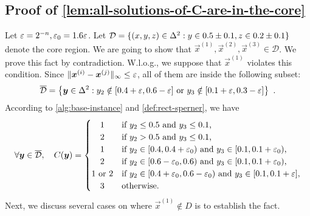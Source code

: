 \subsection{Proof of \cref{lem:all-solutions-of-C-are-in-the-core}}
\label{proof:all-solutions-of-C-are-in-the-core}

\repi*

    Let $\varepsilon=2^{-n}, \varepsilon_0=1.6\varepsilon$.
    Let $\mathcal{D}=\{{(x,y,z)\in \Delta^2: y\in 0.5\pm 0.1, z\in 0.2\pm 0.1} \}$ denote the core region.
    We are going to show that $\vec{x}^{(1)}, \vec{x}^{(2)}, \vec{x}^{(3)}\in \mathcal{D}$.
    We prove this fact by contradiction. 
    W.l.o.g., we suppose that $\vec{x}^{(1)}$ violates this condition.
    Since $\| {\boldsymbol{x}^{(i)}-\boldsymbol{x}^{(j)}} \|_{\infty}\leq \varepsilon$, all of them are inside the following subset:
    \begin{align*}
        \overline{\mathcal{D}} = \left \{{\boldsymbol{y}\in \Delta^2: y_2\notin [0.4+\varepsilon,0.6-\varepsilon] \text{ or } y_3\notin [0.1+\varepsilon,0.3-\varepsilon]} \right \} ~.
    \end{align*}
    According to \cref{alg:base-instance} and \cref{def:rect-sperner}, we have 
    \begin{align*}
        \forall \vec{y}\in \overline{\mathcal{D}}, \quad C(\vec{y}) = \begin{cases}
            \hfill 1 \hfill & \text{if $y_2\leq 0.5$ and $y_3\leq 0.1$,} 
            \\
            \hfill 2 \hfill & \text{if $y_2> 0.5$ and $y_3\leq 0.1$,}\\
            \hfill 1 \hfill & \text{if $y_2\in [0.4,0.4+\eps_0)$ and $y_3\in [0.1, 0.1+\eps_0)$, }\\
            \hfill 2 \hfill & \text{if $y_2\in [0.6-\eps_0,0.6)$ and $y_3\in [0.1, 0.1+\eps_0)$, } \\
            1\text{ or }2 & \text{if $y_2\in [0.4+\eps_0, 0.6-\eps_0)$ and $y_3\in [0.1, 0.1+\eps]$,} \\
            \hfill 3 \hfill & \text{otherwise.}
        \end{cases}
    \end{align*}
    Next, we discuss several cases on where $\vec{x}^{(1)}\notin D$ is to establish the fact.
